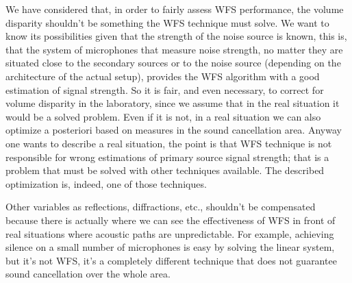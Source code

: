 We have considered that, in order to fairly assess WFS performance, the volume disparity shouldn't be something the WFS technique must solve. We want to know its possibilities given that the strength of the noise source is known, this is, that the system of microphones that measure noise strength, no matter they are situated close to the secondary sources or to the noise source (depending on the architecture of the actual setup), provides the WFS algorithm with a good estimation of signal strength. So it is fair, and even necessary, to correct for volume disparity in the laboratory, since we assume that in the real situation it would be a solved problem. Even if it is not, in a real situation we can also optimize a posteriori based on measures in the sound cancellation area. Anyway one wants to describe a real situation, the point is that WFS technique is not responsible for wrong estimations of primary source signal strength; that is a problem that must be solved with other techniques available. The described optimization is, indeed, one of those techniques.

Other variables as reflections, diffractions, etc., shouldn't be compensated because there is actually where we can see the effectiveness of WFS in front of real situations where acoustic paths are unpredictable. For example, achieving silence on a small number of microphones is easy by solving the linear system, but it's not WFS, it's a completely different technique that does not guarantee sound cancellation over the whole area.
